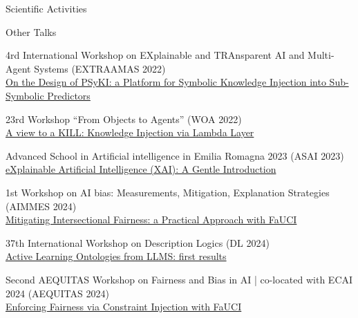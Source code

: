 \documentclass{resume} %
\begin{document}
\begin{rSection}{Scientific Activities}
        \begin{rSubsection2}{Other Talks}
            \item 4rd International Workshop on EXplainable and TRAnsparent AI and Multi-Agent Systems (EXTRAAMAS 2022)
            \\\href{https://apice.unibo.it/xwiki/bin/view/Talk/PsykiExtraamas2022}{On the Design of PSyKI: a Platform for Symbolic Knowledge Injection into Sub-Symbolic Predictors}
            \item 23rd Workshop ``From Objects to Agents'' (WOA 2022)
            \\\href{https://apice.unibo.it/xwiki/bin/view/Talk/KillWoa2022}{A view to a KILL: Knowledge Injection via Lambda Layer}
            \item Advanced School in Artificial intelligence in Emilia Romagna 2023 (ASAI 2023)
            \\\href{https://apice.unibo.it/xwiki/bin/view/Talk/XaiAsaiErBertinoro2023}{eXplainable Artificial Intelligence (XAI): A Gentle Introduction}
            \item 1st Workshop on AI bias: Measurements, Mitigation, Explanation Strategies (AIMMES 2024)
            \\\href{https://apice.unibo.it/xwiki/bin/view/Talk/IntersectionalityAimmes2024}{Mitigating Intersectional Fairness: a Practical Approach with FaUCI}
            \item 37th International Workshop on Description Logics (DL 2024)
            \\\href{https://dl2024.w.uib.no/overview/}{Active Learning Ontologies from LLMS: first results}
            \item Second AEQUITAS Workshop on Fairness and Bias in AI | co-located with ECAI 2024 (AEQUITAS 2024)
            \\\href{https://apice.unibo.it/xwiki/bin/view/Talk/FauciAequitas2024}{Enforcing Fairness via Constraint Injection with FaUCI}
        \end{rSubsection2}

    \end{rSection}


\end{document}
